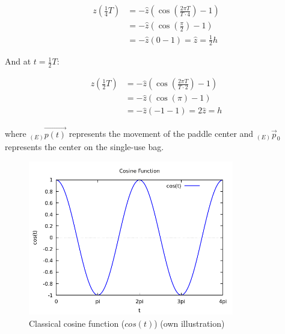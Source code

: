 \begin{equation}
    \begin{aligned}
        z\left(\frac{1}{4}T\right) &= -\hat{z}\left(\cos\left(\frac{2\pi T}{T \cdot 4}\right) - 1\right) \\
        &= -\hat{z}\left(\cos\left(\frac{\pi}{2}\right) - 1\right) \\
        &= -\hat{z}(0 - 1) = \hat{z} = \frac{1}{2} h
    \end{aligned}
\end{equation}

And at \( t = \frac{1}{2}T \):

\begin{equation}
    \begin{aligned}
        z\left(\frac{1}{2}T\right) &= -\hat{z}\left(\cos\left(\frac{2\pi T}{T \cdot 2}\right) - 1\right) \\
        &= -\hat{z}\left(\cos(\pi) - 1\right) \\
        &= -\hat{z}(-1 - 1) = 2\hat{z} = h
    \end{aligned}
\end{equation}

where \( _{(E)}\vec{p(t)} \) represents the movement of the paddle center and \( _{(E)}\vec{p}_{0} \) represents the center on the single-use bag.

\begin{figure}[h]
    \centering
    \includegraphics[width=0.8\textwidth]{bilder/cosine-plot.png}
    \caption[Cosine Function]{Classical cosine function (\( cos(t) \)) (own illustration)}\label{fig:CosineFunction}
\end{figure}
\FloatBarrier

